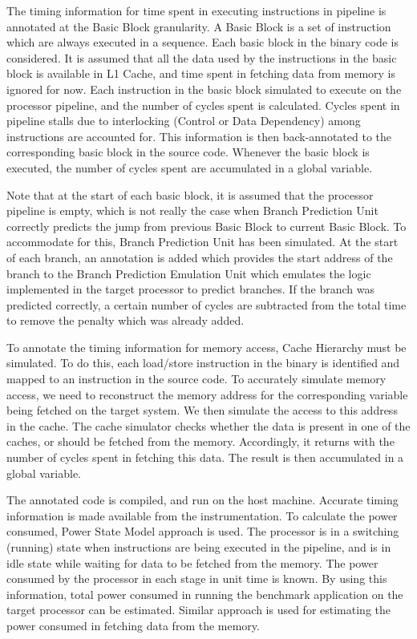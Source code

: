 The timing information for time spent in executing instructions in pipeline is annotated at the Basic Block granularity. A Basic Block is a set of instruction which are always executed in a sequence. Each basic block in the binary code is considered. It is assumed that all the data used by the instructions in the basic block is available in L1 Cache, and time spent in fetching data from memory is ignored for now. Each instruction in the basic block simulated to execute on the processor pipeline, and the number of cycles spent is calculated. Cycles spent in pipeline stalls due to interlocking (Control or Data Dependency) among instructions are accounted for. This information is then back-annotated to the corresponding basic block in the source code. Whenever the basic block is executed, the number of cycles spent are accumulated in a global variable. 

Note that at the start of each basic block, it is assumed that the processor pipeline is empty, which is not really the case when Branch Prediction Unit correctly predicts the jump from previous Basic Block to current Basic Block. To accommodate for this, Branch Prediction Unit has been simulated. At the start of each branch, an annotation is added which provides the start address of the branch to the Branch Prediction Emulation Unit which emulates the logic implemented in the target processor to predict branches. If the branch was predicted correctly, a certain number of cycles are subtracted from the total time to remove the penalty which was already added. 

To annotate the timing information for memory access, Cache Hierarchy must be simulated. To do this, each load/store instruction in the binary is identified and mapped to an instruction in the source code. To accurately simulate memory access, we need to reconstruct the memory address for the corresponding variable being fetched on the target system. We then simulate the access to this address in the cache. The cache simulator checks whether the data is present in one of the caches, or should be fetched from the memory. Accordingly, it returns with the number of cycles spent in fetching this data. The result is then accumulated in a global variable.

The annotated code is compiled, and run on the host machine. Accurate timing information is made available from the instrumentation. To calculate the power consumed, Power State Model approach is used. The processor is in a switching (running) state when instructions are being executed in the pipeline, and is in idle state while waiting for data to be fetched from the memory. The power consumed by the processor in each stage in unit time is known. By using this information, total power consumed in running the benchmark application on the target processor can be estimated. Similar approach is used for estimating the power consumed in fetching data from the memory.

